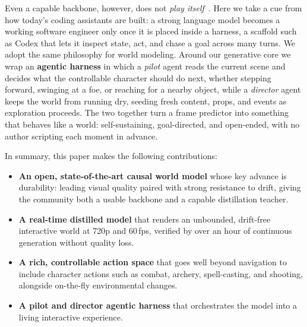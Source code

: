 Even a capable backbone, however, does not \emph{play itself}~\cite{Hu2024StoryAgentCS,Lian2023LLMgroundedVD,Huang2023FreeBloomZT}. Here we take a cue from how today's coding assistants are built: a strong language model becomes a working software engineer only once it is placed inside a harness, a scaffold such as Codex that lets it inspect state, act, and chase a goal across many turns. We adopt the same philosophy for world modeling. Around our generative core we wrap an \textbf{agentic harness} in which a \emph{pilot} agent reads the current scene and decides what the controllable character should do next, whether stepping forward, swinging at a foe, or reaching for a nearby object, while a \emph{director} agent keeps the world from running dry, seeding fresh content, props, and events as exploration proceeds. The two together turn a frame predictor into something that behaves like a world: self-sustaining, goal-directed, and open-ended, with no author scripting each moment in advance.

In summary, this paper makes the following contributions:

\begin{itemize}
    \item \textbf{An open, state-of-the-art causal world model} whose key advance is durability: leading visual quality paired with strong resistance to drift, giving the community both a usable backbone and a capable distillation teacher.

    \item \textbf{A real-time distilled model} that renders an unbounded, drift-free interactive world at 720p and 60\,fps, verified by over an hour of continuous generation without quality loss.

    \item \textbf{A rich, controllable action space} that goes well beyond navigation to include character actions such as combat, archery, spell-casting, and shooting, alongside on-the-fly environmental changes.

    \item \textbf{A pilot and director agentic harness} that orchestrates the model into a living interactive experience.
\end{itemize}

